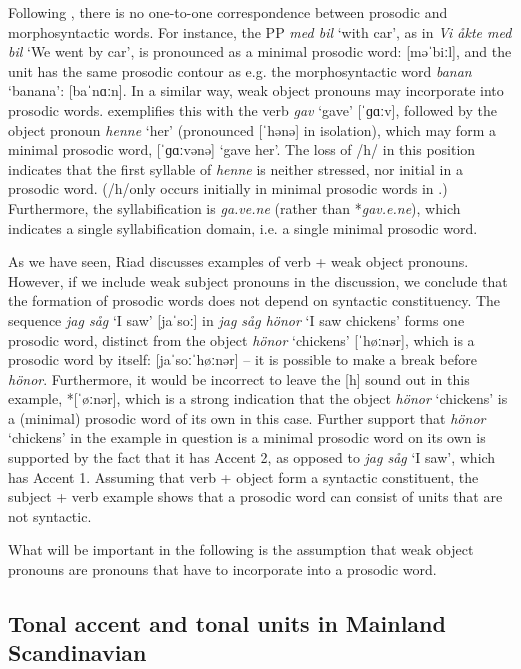 \documentclass[output=paper]{LSP/langsci}
\begin{document}
  Following \citealt{Selkirk1996}, there is no one-to-one correspondence between prosodic and morphosyntactic words. For instance, the PP \textit{med bil} `with car’, as in \textit{Vi åkte med bil} `We went by car’, is pronounced as a minimal prosodic word: [məˈbiːl], and the unit has the same prosodic contour as e.g. the morphosyntactic word \textit{banan} ‘banana’: [baˈnɑːn]. In a similar way, weak object pronouns may incorporate into prosodic words. \citet[131]{Riad2013} exemplifies this with the verb \textit{gav} ‘gave’ [ˈɡɑːv], followed by the object pronoun \textit{henne} ‘her’ (pronounced [ˈhənə] in isolation), which may form a minimal prosodic word, [ˈɡɑːvənə] ‘gave her’. The loss of /h/ in this position indicates that the first syllable of \textit{henne} is neither stressed, nor initial in a prosodic word. (/h/only occurs initially in minimal prosodic words in .) Furthermore, the syllabification is \textit{ga.ve.ne} (rather than *\textit{gav.e.ne}), which indicates a single syllabification domain, i.e. a single minimal prosodic word. 

  As we have seen, Riad discusses examples of verb + weak object pronouns. However, if we include weak subject pronouns in the discussion, we conclude that the formation of prosodic words does not depend on syntactic constituency. The sequence \textit{jag såg} ‘I saw’ [jaˈsoː] in \textit{jag såg hönor} ‘I saw chickens’ forms one prosodic word, distinct from the object \textit{hönor} `chickens’ [ˈhøːnər], which is a prosodic word by itself: [jaˈsoːˈhøːnər] – it is possible to make a break before \textit{hönor}.  Furthermore, it would be incorrect to leave the [h] sound out in this example, *[ˈøːnər], which is a strong indication that the object \textit{hönor} `chickens’ is a (minimal) prosodic word of its own in this case. Further support that \textit{hönor} `chickens’ in the example in {question} is a minimal prosodic word on its own is supported by the fact that it has Accent 2, as opposed to \textit{jag såg} `I saw’, which has Accent 1. Assuming that verb + object form a syntactic constituent, the subject + verb example shows that a prosodic word can consist of units that are not syntactic. 

  What will be important in the following is the assumption that weak object pronouns are pronouns that have to incorporate into a prosodic word. 

\subsection{Tonal accent and tonal units in Mainland Scandinavian}\label{sec:erteschik:3.2}
\end{document}

